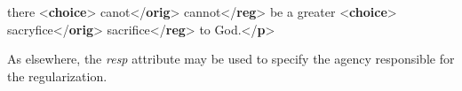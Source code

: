 \begin{shaded}
\mbox{}\newline 
 there {<\textbf{choice}>}\mbox{}\newline 
\hspace*{1em}canot{</\textbf{orig}>}\mbox{}\newline 
\hspace*{1em}cannot{</\textbf{reg}>}\mbox{}\newline 
{} be a greater\mbox{}\newline 
{<\textbf{choice}>}\mbox{}\newline 
\hspace*{1em}sacryfice{</\textbf{orig}>}\mbox{}\newline 
\hspace*{1em}sacrifice{</\textbf{reg}>}\mbox{}\newline 
{} to God.{</\textbf{p}>}\end{shaded}\egroup\par \par
As elsewhere, the {\itshape resp} attribute may be used to specify the agency responsible for the regularization.

